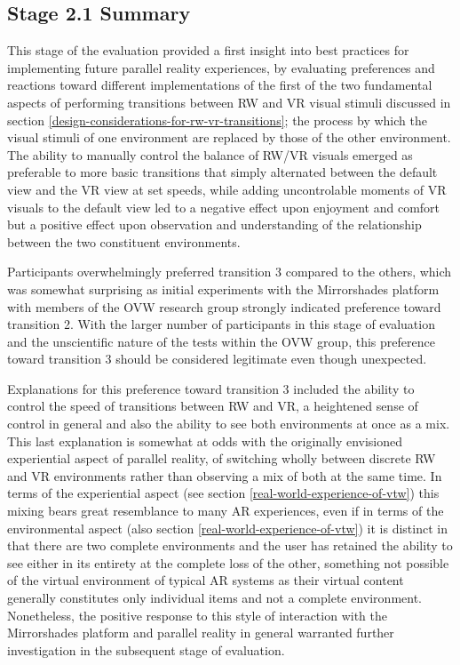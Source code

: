 
\subsection{Stage 2.1 Summary}

This stage of the evaluation provided a first insight into best practices for implementing future parallel reality experiences, by evaluating preferences and reactions toward different implementations of the first of the two fundamental aspects of performing transitions between RW and VR visual stimuli discussed in section \ref{design-considerations-for-rw-vr-transitions}; the process by which the visual stimuli of one environment are replaced by those of the other environment. The ability to manually control the balance of RW/VR visuals emerged as preferable to more basic transitions that simply alternated between the default view and the VR view at set speeds, while adding uncontrolable moments of VR visuals to the default view led to a negative effect upon enjoyment and comfort but a positive effect upon observation and understanding of the relationship between the two constituent environments.

Participants overwhelmingly preferred transition 3 compared to the others, which was somewhat surprising as initial experiments with the Mirrorshades platform with members of the OVW research group strongly indicated preference toward transition 2. With the larger number of participants in this stage of evaluation and the unscientific nature of the tests within the OVW group, this preference toward transition 3 should be considered legitimate even though unexpected.

Explanations for this preference toward transition 3 included the ability to control the speed of transitions between RW and VR, a heightened sense of control in general and also the ability to see both environments at once as a mix. This last explanation is somewhat at odds with the originally envisioned experiential aspect of parallel reality, of switching wholly between discrete RW and VR environments rather than observing a mix of both at the same time. In terms of the experiential aspect (see section \ref{real-world-experience-of-vtw}) this mixing bears great resemblance to many AR experiences, even if in terms of the environmental aspect (also section \ref{real-world-experience-of-vtw}) it is distinct in that there are two complete environments and the user has retained the ability to see either in its entirety at the complete loss of the other, something not possible of the virtual environment of typical AR systems as their virtual content generally constitutes only individual items and not a complete environment. Nonetheless, the positive response to this style of interaction with the Mirrorshades platform and parallel reality in general warranted further investigation in the subsequent stage of evaluation.

